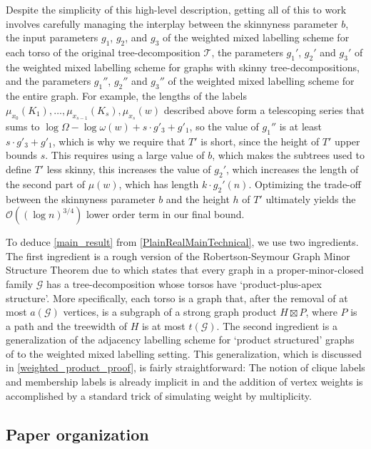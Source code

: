 \documentclass{patmorin}
\newcommand{\Oh}{\calO}
\newcommand{\calG}{\mathcal{G}}
\newcommand{\calO}{\mathcal{O}}
\newcommand{\calT}{\mathcal{T}}
\begin{document}
  Despite the simplicity of this high-level description, getting all of this to work involves carefully managing the interplay between the skinnyness parameter $b$, the input parameters $g_1$, $g_2$, and $g_3$ of the weighted mixed labelling scheme for each torso of the original tree-decomposition $\calT$, the parameters $g_1'$, $g_2'$ and $g_3'$ of the weighted mixed labelling scheme for graphs with skinny tree-decompositions, and the parameters $g_1''$, $g_2''$ and $g_3''$ of the weighted mixed labelling scheme for the entire graph. For example, the lengths of the labels $\mu_{x_0}(K_1),\ldots,\mu_{x_{s-1}}(K_s),\mu_{x_s}(w)$ described above form a telescoping series that sums to $\log\Omega - \log\omega(w) + s\cdot g'_3 + g'_1$, so the value of $g_1''$ is at least $s\cdot g'_3 + g'_1$, which is why we require that $T'$ is short, since the height of $T'$ upper bounds $s$.  This requires using a large value of $b$, which makes the subtrees used to define $T'$ less skinny, this increases the value of $g_2'$, which increases the length of the second part of $\mu(w)$, which has length $k\cdot g_2'(n)$.
  Optimizing the trade-off between the skinnyness parameter $b$ and the height $h$ of $T'$ ultimately yields the $\Oh((\log n)^{3/4})$ lower order term in our final bound.


  To deduce \cref{main_result} from \cref{PlainRealMainTechnical}, we use two ingredients.  The first ingredient is a rough
  version of the Robertson-Seymour Graph Minor Structure Theorem due to \citet{dujmovic.joret.ea:planar} which states that every graph in a proper-minor-closed family $\calG$ has a tree-decomposition whose torsos have `product-plus-apex structure'. More specifically, each torso is a graph that, after the removal of at most $a(\calG)$ vertices, is a subgraph of a strong graph product $H\boxtimes P$, where $P$ is a path and the treewidth of $H$ is at most $t(\calG)$.  The second ingredient is a generalization of the adjacency labelling scheme for `product structured' graphs of \citet{dujmovic.esperet.ea:adjacency} to the weighted mixed labelling setting.  This generalization, which is discussed in \cref{weighted_product_proof}, is fairly straightforward: The notion of clique labels and membership labels is already implicit in \cite{dujmovic.esperet.ea:adjacency} and the addition of vertex weights is accomplished by a standard trick of simulating weight by multiplicity.

\subsection{Paper organization}
\end{document}

